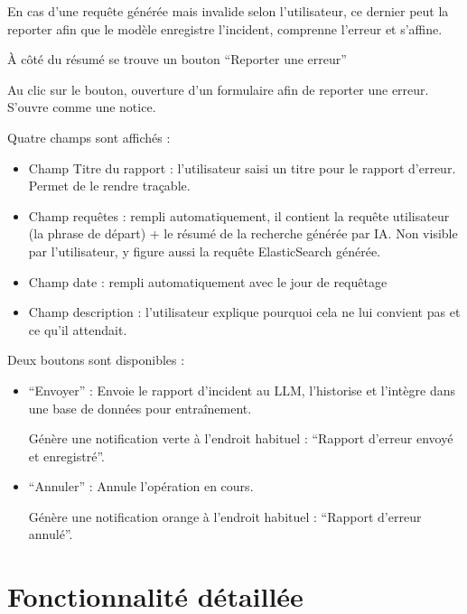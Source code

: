 En cas d’une requête générée mais invalide selon l’utilisateur, ce dernier peut la reporter afin que le modèle enregistre l’incident, comprenne l’erreur et s’affine. 

À côté du résumé se trouve un bouton “Reporter une erreur”  

Au clic sur le bouton, ouverture d’un formulaire afin de reporter une erreur. S’ouvre comme une notice. 

Quatre champs sont affichés :  

\begin{itemize}
	\item Champ Titre du rapport : l’utilisateur saisi un titre pour le rapport d’erreur. Permet de le rendre traçable. 

	\item Champ requêtes : rempli automatiquement, il contient la requête utilisateur (la phrase de départ) + le résumé de la recherche générée par IA. Non visible par l’utilisateur, y figure aussi la requête ElasticSearch générée.  

	\item Champ date : rempli automatiquement avec le jour de requêtage 

	\item Champ description : l’utilisateur explique pourquoi cela ne lui convient pas et ce qu’il attendait.  
\end{itemize}



Deux boutons sont disponibles :  

\begin{itemize}
	\item “Envoyer” : 
	\subitem Envoie le rapport d’incident au LLM, l’historise et l’intègre dans une base de données pour entraînement. 

	\subitem Génère une notification verte à l’endroit habituel : “Rapport d’erreur envoyé et enregistré”. 

	\item “Annuler” : Annule l’opération en cours. 

	\subitem Génère une notification orange à l’endroit habituel : “Rapport d’erreur annulé”. 
\end{itemize}



\section{Fonctionnalité détaillée}

